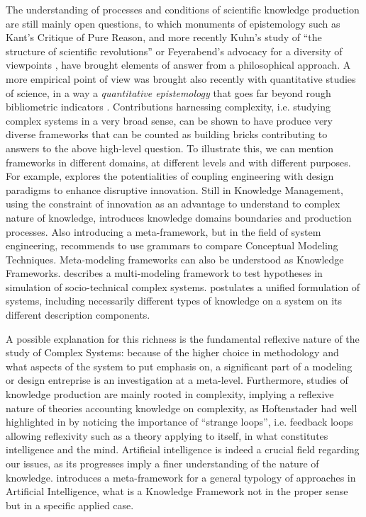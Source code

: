 \documentclass[runningheads,a4paper]{llncs2e/llncs}
\begin{document}
The understanding of processes and conditions of scientific knowledge production are still mainly open questions, to which monuments of epistemology such as Kant's Critique of Pure Reason, and more recently Kuhn's study of ``the structure of scientific revolutions'' %
or Feyerabend's advocacy for a diversity of viewpoints \cite{feyerabend1993against}, have brought elements of answer from a philosophical approach. A more empirical point of view was brought also recently with quantitative studies of science, in a way a \emph{quantitative epistemology} that goes far beyond rough bibliometric indicators %
. Contributions harnessing complexity, i.e. studying complex systems in a very broad sense, can be shown to have produce very diverse frameworks that can be counted as building bricks contributing to answers to the above high-level question. %
 To illustrate this, we can mention frameworks in different domains, at different levels and with different purposes. For example, \cite{durantin2017disruptive} explores the potentialities of coupling engineering with design paradigms to enhance disruptive innovation. Still in Knowledge Management, using the constraint of innovation as an advantage to understand to complex nature of knowledge, \cite{carlile2004transferring} introduces knowledge domains boundaries and production processes. Also introducing a meta-framework, but in the field of system engineering, \cite{gemino2004framework} recommends to use grammars to compare Conceptual Modeling Techniques. Meta-modeling frameworks can also be understood as Knowledge Frameworks. \cite{cottineau2015modular} describes a multi-modeling framework to test hypotheses in simulation of socio-technical complex systems. \cite{golden2012modeling} postulates a unified formulation of systems, including necessarily different types of knowledge on a system on its different description components.
 
A possible explanation for this richness is the fundamental reflexive nature of the study of Complex Systems: because of the higher choice in methodology and what aspects of the system to put emphasis on, a significant part of a modeling or design entreprise is an investigation at a meta-level.  Furthermore, studies of knowledge production are mainly rooted in complexity, implying a reflexive nature of theories accounting knowledge on complexity, as Hoftenstader had well highlighted in %
by noticing the importance of ``strange loops'', i.e. feedback loops allowing reflexivity such as a theory applying to itself, in what constitutes intelligence and the mind. Artificial intelligence is indeed a crucial field regarding our issues, as its progresses imply a finer understanding of the nature of knowledge. %
introduces a meta-framework for a general typology of approaches in Artificial Intelligence, what is a Knowledge Framework not in the proper sense but in a specific applied case.
\end{document}
